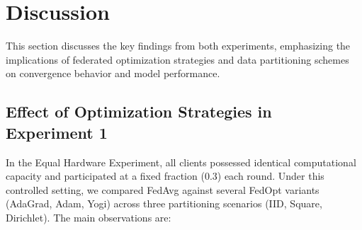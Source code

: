 \documentclass[11pt]{article}
\begin{document}
    \section{Discussion}

    This section discusses the key findings from both experiments, emphasizing the implications of federated optimization strategies and data partitioning schemes on convergence behavior and model performance.

    \subsection{Effect of Optimization Strategies in Experiment 1}

    In the Equal Hardware Experiment, all clients possessed identical computational capacity and participated at a fixed fraction (0.3) each round. Under this controlled setting, we compared FedAvg against several FedOpt variants (AdaGrad, Adam, Yogi) across three partitioning scenarios (IID, Square, Dirichlet). The main observations are:
\end{document}
